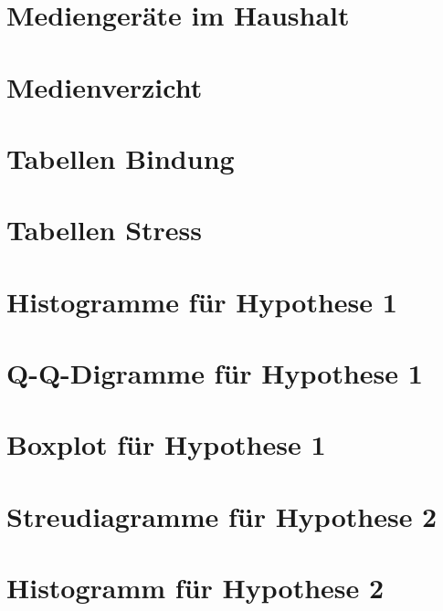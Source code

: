 \section{Mediengeräte im Haushalt}\label{app:Mediengeräte}

\newpage

\section{Medienverzicht}\label{app:Medienverzicht}

\newpage

\section{Tabellen Bindung}\label{app:TablesAas}

\newpage

\section{Tabellen Stress}\label{app:TablesPsq}

\newpage

\section{Histogramme für Hypothese 1}\label{app:Hypo1_Histogramme}

\newpage
\section{Q-Q-Digramme für Hypothese 1}\label{app:Hypo1_QQDiagramme}

\newpage
\section{Boxplot für Hypothese 1}\label{app:Hypo1_Boxplot}

\newpage
\section{Streudiagramme für Hypothese 2}\label{app:Hypo2_Streudiagramm}

\newpage
\section{Histogramm für Hypothese 2}\label{app:Hypo2_Histogramm}

\newpage
